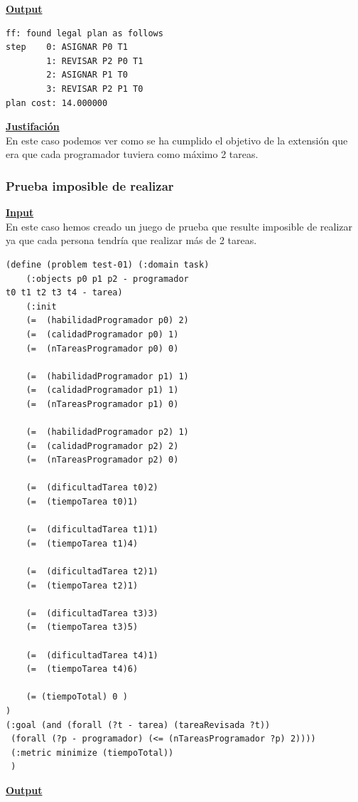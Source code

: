 \documentclass[11pt]{article}
\begin{document}
 \noindent \underline{\textbf{Output}}
\medskip
\begin{verbatim}
ff: found legal plan as follows
step    0: ASIGNAR P0 T1
        1: REVISAR P2 P0 T1
        2: ASIGNAR P1 T0
        3: REVISAR P2 P1 T0
plan cost: 14.000000

\end{verbatim}
\medskip

\noindent \underline{\textbf{Justifación}}\\

En este caso podemos ver como se ha cumplido el objetivo de la extensión que era que cada programador tuviera como máximo 2 tareas. 

\subsubsection{Prueba imposible de realizar}
\noindent \underline{\textbf{Input}} 
\\

En este caso hemos creado un juego de prueba que resulte imposible de realizar ya que cada persona tendría que realizar más de 2 tareas. 
\medskip
\begin{verbatim}
(define (problem test-01) (:domain task) 
	(:objects p0 p1 p2 - programador
t0 t1 t2 t3 t4 - tarea)
	(:init
	(=  (habilidadProgramador p0) 2)
	(=  (calidadProgramador p0) 1)
	(=  (nTareasProgramador p0) 0)

	(=  (habilidadProgramador p1) 1)
	(=  (calidadProgramador p1) 1)
	(=  (nTareasProgramador p1) 0)

	(=  (habilidadProgramador p2) 1)
	(=  (calidadProgramador p2) 2)
	(=  (nTareasProgramador p2) 0)

	(=  (dificultadTarea t0)2)
	(=  (tiempoTarea t0)1)

	(=  (dificultadTarea t1)1)
	(=  (tiempoTarea t1)4)

	(=  (dificultadTarea t2)1)
	(=  (tiempoTarea t2)1)

	(=  (dificultadTarea t3)3)
	(=  (tiempoTarea t3)5)

	(=  (dificultadTarea t4)1)
	(=  (tiempoTarea t4)6)

	(= (tiempoTotal) 0 )
)
(:goal (and (forall (?t - tarea) (tareaRevisada ?t))
 (forall (?p - programador) (<= (nTareasProgramador ?p) 2))))
 (:metric minimize (tiempoTotal))
 )

\end{verbatim}

\noindent \underline{\textbf{Output}}
\\
\end{document}
